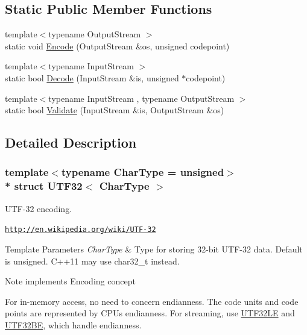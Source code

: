 \subsection*{Static Public Member Functions}
\begin{DoxyCompactItemize}
\item 
{\footnotesize template$<$typename Output\+Stream $>$ }\\static void \hyperlink{structUTF32_a511d1b09672ce535085895a28d8c2f13}{Encode} (Output\+Stream \&os, unsigned codepoint)
\item 
{\footnotesize template$<$typename Input\+Stream $>$ }\\static bool \hyperlink{structUTF32_a6e7258a5e982e101345dffdc355e9b53}{Decode} (Input\+Stream \&is, unsigned $\ast$codepoint)
\item 
{\footnotesize template$<$typename Input\+Stream , typename Output\+Stream $>$ }\\static bool \hyperlink{structUTF32_a71336fb0546b3079e01bbd51d2fa2e45}{Validate} (Input\+Stream \&is, Output\+Stream \&os)
\end{DoxyCompactItemize}


\subsection{Detailed Description}
\subsubsection*{template$<$typename Char\+Type = unsigned$>$\\*
struct U\+T\+F32$<$ Char\+Type $>$}

U\+T\+F-\/32 encoding. 

\href{http://en.wikipedia.org/wiki/UTF-32}{\tt http\+://en.\+wikipedia.\+org/wiki/\+U\+T\+F-\/32} 
\begin{DoxyTemplParams}{Template Parameters}
{\em Char\+Type} & Type for storing 32-\/bit U\+T\+F-\/32 data. Default is unsigned. C++11 may use char32\+\_\+t instead. \\
\hline
\end{DoxyTemplParams}
\begin{DoxyNote}{Note}
implements Encoding concept

For in-\/memory access, no need to concern endianness. The code units and code points are represented by C\+PU\textquotesingle{}s endianness. For streaming, use \hyperlink{structUTF32LE}{U\+T\+F32\+LE} and \hyperlink{structUTF32BE}{U\+T\+F32\+BE}, which handle endianness. 
\end{DoxyNote}


